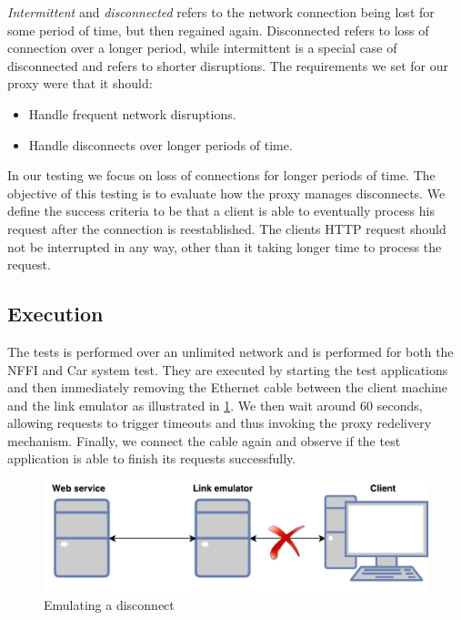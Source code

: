 \textit{Intermittent} and \textit{disconnected} refers to the network connection
being lost for some period of time, but then regained again. Disconnected refers
to loss of connection over a longer period, while intermittent is a special case
of disconnected and refers to shorter disruptions. The requirements we set for
our proxy were that it should:

\begin{itemize}

    \item Handle frequent network disruptions.
    \item Handle disconnects over longer periods of time.

\end{itemize}



In our testing we focus on loss of connections for longer periods of time. The
objective of this testing is to evaluate how the proxy manages disconnects. We
define the success criteria to be that a client is able to eventually process
his request after the connection is reestablished. The clients HTTP request
should not be interrupted in any way, other than it taking longer time to
process the request.

\subsection{Execution}

 The tests is performed over an unlimited network and is performed for both the
 NFFI and Car system test. They are executed by starting the test applications
 and then immediately removing the Ethernet cable between the client machine and
 the link emulator as illustrated in \cref{figure-testing-disconncted}. We then
 wait around 60 seconds, allowing requests to trigger timeouts and thus invoking
 the proxy redelivery mechanism. Finally, we connect the cable again and
 observe if the test application is able to finish its requests successfully.

 \begin{figure}[h]
 \includegraphics[width=\textwidth]{images/testing_disconnected.pdf}
 \caption{Emulating a disconnect}
 \label{figure-testing-disconncted}
 \end{figure}


